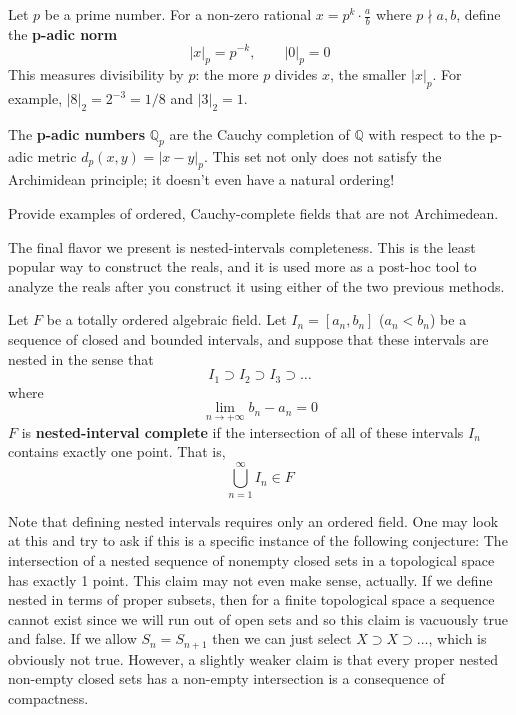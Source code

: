   \begin{example}
    Let $p$ be a prime number. For a non-zero rational $x = p^k \cdot \frac{a}{b}$ where $p \nmid a, b$, define the \textbf{p-adic norm}
    \begin{equation}
      |x|_p = p^{-k}, \qquad |0|_p = 0
    \end{equation}
    This measures divisibility by $p$: the more $p$ divides $x$, the smaller $|x|_p$. For example, $|8|_2 = 2^{-3} = 1/8$ and $|3|_2 = 1$.

    The \textbf{p-adic numbers} $\mathbb{Q}_p$ are the Cauchy completion of $\mathbb{Q}$ with respect to the p-adic metric $d_p(x,y) = |x - y|_p$. This set not only does not satisfy the Archimidean principle; it doesn't even have a natural ordering! 
  \end{example} 

  \begin{example}
    Provide examples of ordered, Cauchy-complete fields that are not Archimedean. 
  \end{example}

  The final flavor we present is nested-intervals completeness.  This is the least popular way to construct the reals, and it is used more as a post-hoc tool to analyze the reals after you construct it using either of the two previous methods. 

  \begin{definition}
    Let $F$ be a totally ordered algebraic field. Let $I_n= [a_n, b_n]$ ($a_n < b_n$) be a sequence of closed and bounded intervals, and suppose that these intervals are nested in the sense that 
    \begin{equation}
      I_1 \supset I_2 \supset I_3 \supset \ldots
    \end{equation}
    where 
    \begin{equation}
      \lim_{n \rightarrow + \infty} b_n - a_n = 0
    \end{equation}
    $F$ is \textbf{nested-interval complete} if the intersection of all of these intervals $I_n$ contains exactly one point. That is, 
    \[\bigcup_{n=1}^\infty I_n \in F\]
  \end{definition}

  Note that defining nested intervals requires only an ordered field. One may look at this and try to ask if this is a specific instance of the following conjecture: The intersection of a nested sequence of nonempty closed sets in a topological space has exactly 1 point. This claim may not even make sense, actually. If we define nested in terms of proper subsets, then for a finite topological space a sequence cannot exist since we will run out of open sets and so this claim is vacuously true and false. If we allow $S_n = S_{n+1}$ then we can just select $X \supset X \supset \ldots$, which is obviously not true. However, a slightly weaker claim is that every proper nested non-empty closed sets has a non-empty intersection is a consequence of compactness. 

